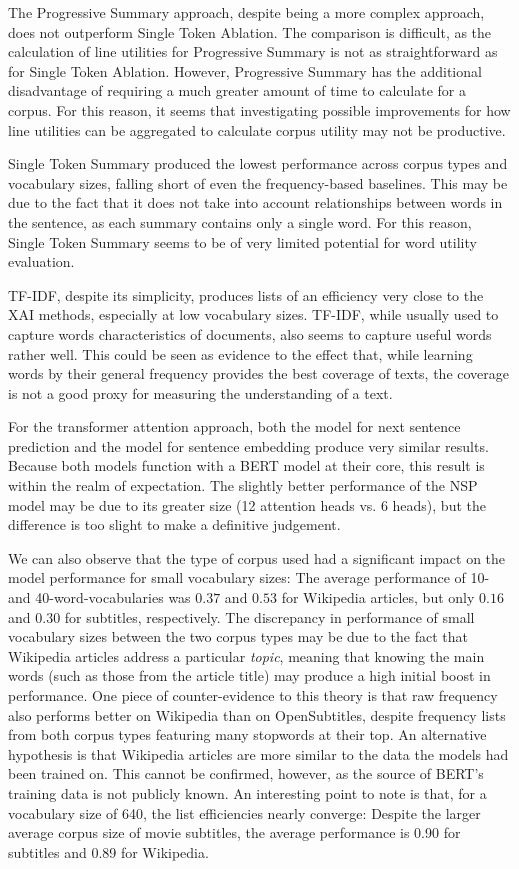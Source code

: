 The Progressive Summary approach, despite being a more complex approach, does not outperform Single Token Ablation.
The comparison is difficult, as the calculation of line utilities for Progressive Summary is not as straightforward as for Single Token Ablation.
However, Progressive Summary has the additional disadvantage of requiring a much greater amount of time to calculate for a corpus.
For this reason, it seems that investigating possible improvements for how line utilities can be aggregated to calculate corpus utility may not be productive.

Single Token Summary produced the lowest performance across corpus types and vocabulary sizes, falling short of even the frequency-based baselines.
This may be due to the fact that it does not take into account relationships between words in the sentence, as each summary contains only a single word.
For this reason, Single Token Summary seems to be of very limited potential for word utility evaluation.

TF-IDF, despite its simplicity, produces lists of an efficiency very close to the XAI methods, especially at low vocabulary sizes.
TF-IDF, while usually used to capture words characteristics of documents, also seems to capture useful words rather well.
This could be seen as evidence to the effect that, while learning words by their general frequency provides the best coverage of texts, the coverage is not a good proxy for measuring the understanding of a text.


For the transformer attention approach, both the model for next sentence prediction and the model for sentence embedding produce very similar results.
Because both models function with a BERT model at their core, this result is within the realm of expectation.
The slightly better performance of the NSP model may be due to its greater size (12 attention heads vs. 6 heads), but the difference is too slight to make a definitive judgement.

We can also observe that the type of corpus used had a significant impact on the model performance for small vocabulary sizes:
The average performance of 10- and 40-word-vocabularies was $0.37$ and $0.53$ for Wikipedia articles, but only $0.16$ and $0.30$ for subtitles, respectively.
The discrepancy in performance of small vocabulary sizes between the two corpus types may be due to the fact that Wikipedia articles address a particular \textit{topic}, meaning that knowing the main words (such as those from the article title) may produce a high initial boost in performance.
One piece of counter-evidence to this theory is that raw frequency also performs better on Wikipedia than on OpenSubtitles, despite frequency lists from both corpus types featuring many stopwords at their top.
An alternative hypothesis is that Wikipedia articles are more similar to the data the models had been trained on.
This cannot be confirmed, however, as the source of BERT's training data is not publicly known.
An interesting point to note is that, for a vocabulary size of 640, the list efficiencies nearly converge:
Despite the larger average corpus size of movie subtitles, the average performance is 0.90 for subtitles and 0.89 for Wikipedia.

